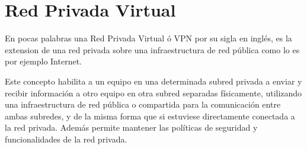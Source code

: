 



\section{Red Privada Virtual}
\label{section2.7}

En pocas palabras una Red Privada Virtual \'o VPN por su sigla en ingl\'es, es la extension de una red privada sobre una infraestructura de red p\'ublica como lo es por ejemplo Internet.

Este concepto habilita a un equipo en una determinada subred privada a enviar y recibir información a otro equipo en otra subred separadas f\'isicamente, utilizando una infraestructura de red p\'ublica o compartida para la comunicaci\'on entre ambas subredes, y de la misma forma que si estuviese directamente conectada a la red privada. Adem\'as permite mantener las políticas de seguridad y funcionalidades de la red privada.\\


